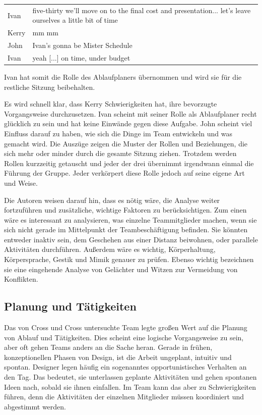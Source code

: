\begin{extract}[John bestätigt Ivan erneut in seiner Rolle.]
	{
		\myfloatalign
		\begin{tabularx}{\textwidth}{p{1cm}X}
    		Ivan & five-thirty we'll move on to the final cost and presentation... let's leave ourselves a little bit of time \\
			Kerry & mm mm \\
			John & Ivan's gonna be Mister Schedule \\
			Ivan & yeah [...] on time, under budget
		\end{tabularx}
	}
\end{extract}

Ivan hat somit die Rolle des Ablaufplaners übernommen und wird sie für die restliche Sitzung beibehalten.

\medskip Es wird schnell klar, dass Kerry Schwierigkeiten hat, ihre bevorzugte Vorgangsweise durchzusetzen. Ivan scheint mit seiner Rolle als Ablaufplaner recht glücklich zu sein und hat keine Einwände gegen diese Aufgabe. John scheint viel Einfluss darauf zu haben, wie sich die Dinge im Team entwickeln und was gemacht wird. Die Auszüge zeigen die Muster der Rollen und Beziehungen, die sich mehr oder minder durch die gesamte Sitzung ziehen. Trotzdem werden Rollen kurzzeitig getauscht und jeder der drei übernimmt irgendwann einmal die Führung der Gruppe. Jeder verkörpert diese Rolle jedoch auf seine eigene Art und Weise.

Die Autoren weisen darauf hin, dass es nötig wäre, die Analyse weiter fortzuführen und zusätzliche, wichtige Faktoren zu berücksichtigen. Zum einen wäre es interessant zu analysieren, was einzelne Teammitglieder machen, wenn sie sich nicht gerade im Mittelpunkt der Teambeschäftigung befinden. Sie könnten entweder inaktiv sein, dem Geschehen aus einer Distanz beiwohnen, oder parallele Aktivitäten durchführen. Außerdem wäre es wichtig, Körperhaltung, Körpersprache, Gestik und Mimik genauer zu prüfen. Ebenso wichtig bezeichnen sie eine eingehende Analyse von Gelächter und Witzen zur Vermeidung von Konflikten.

\subsection{Planung und Tätigkeiten}\label{sec:collabActions}

Das von Cross und Cross untersuchte Team legte großen Wert auf die Planung von Ablauf und Tätigkeiten. Dies scheint eine logische Vorgangsweise zu sein, aber oft gehen Teams anders an die Sache heran. Gerade in frühen, konzeptionellen Phasen von Design, ist die Arbeit ungeplant, intuitiv und spontan. Designer legen häufig ein sogenanntes opportunistisches Verhalten an den Tag. Das bedeutet, sie unterlassen geplante Aktivitäten und gehen spontanen Ideen nach, sobald sie ihnen einfallen. Im Team kann das aber zu Schwierigkeiten führen, denn die Aktivitäten der einzelnen Mitglieder müssen koordiniert und abgestimmt werden. 

